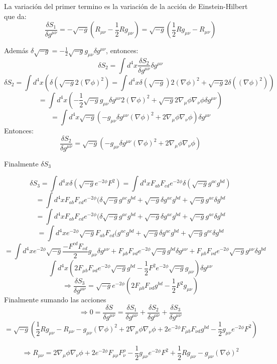 \documentclass[10pt,a4paper]{article}
\begin{document}
La variación del primer termino es la variación de la acción de Einstein-Hilbert que da:
$$\frac{\delta S_1}{\delta g^{\mu\nu}} = -\sqrt{-g}(R_{\mu\nu} - \frac{1}{2}Rg_{\mu\nu})=\sqrt{-g}(\frac{1}{2}Rg_{\mu\nu}- R_{\mu\nu}) $$

Además $\delta\sqrt{-g} = -\frac{1}{2} \sqrt{-g} g_{\mu\nu}\delta g^{\mu\nu}$, entonces:
$$\delta S_2 = \int d^4 x \frac{\delta S_2}{\delta g^{\mu \nu}}\delta g^{\mu \nu}$$
$$\delta S_2 = \int d^4 x (\delta(\sqrt{-g}2(\nabla \phi)^2)= \int d^4 x \delta(\sqrt{-g})2(\nabla \phi)^2 + \sqrt{-g}2\delta((\nabla \phi)^2))$$
$$= \int d^4 x (-\frac{1}{2} \sqrt{-g} g_{\mu\nu}\delta g^{\mu\nu}2(\nabla \phi)^2 + \sqrt{-g}2\nabla_\mu \phi \nabla_\nu \phi \delta g^{\mu \nu})$$
$$= \int d^4 x \sqrt{-g}(-g_{\mu\nu}\delta g^{\mu\nu}(\nabla \phi)^2 + 2\nabla_\mu \phi \nabla_\nu \phi) \delta g^{\mu \nu}$$
Entonces:
$$\frac{\delta S_2}{\delta g^{\mu \nu}}= \sqrt{-g}(-g_{\mu\nu}\delta g^{\mu\nu}(\nabla \phi)^2 + 2\nabla_\mu \phi \nabla_\nu \phi) $$

Finalmente $\delta S_3$

$$\delta S_3 = \int d^4x \delta(\sqrt{-g}e^{-2 \phi} F^2) = \int d^4x F_{ab}F_{cd}e^{-2 \phi}\delta(\sqrt{-g} g^{ac}g^{bd})$$
$$= \int d^4x F_{ab}F_{cd}e^{-2 \phi}(\delta\sqrt{-g} g^{ac}g^{bd} + \sqrt{-g} \delta g^{ac}g^{bd} + \sqrt{-g} g^{ac}\delta g^{bd}$$
$$= \int d^4x F_{ab}F_{cd}e^{-2 \phi}(\delta\sqrt{-g} g^{ac}g^{bd} + \sqrt{-g} \delta g^{ac}g^{bd} + \sqrt{-g} g^{ac}\delta g^{bd}$$
$$= \int d^4x e^{-2 \phi}\sqrt{-g}F_{ab}F_{cd}( g^{ac}g^{bd} + \sqrt{-g} \delta g^{ac}g^{bd} + \sqrt{-g} g^{ac}\delta g^{bd}$$
$$= \int d^4x e^{-2 \phi}\sqrt{-g}\frac{-F^{cd}F_{cd}}{2} g_{\mu \nu} \delta g^{\mu \nu} + F_{\mu b} F_{\nu d}e^{-2 \phi}\sqrt{-g} g^{bd} \delta g^{\mu \nu} + F_{\mu b} F_{\nu d}e^{-2 \phi}\sqrt{-g} g^{\mu \nu} \delta g^{bd} $$
$$\int d^4 x(2 F_{\mu b} F_{\nu d}e^{-2 \phi}\sqrt{-g} g^{b d} - \frac{1}{2}  F^2 e^{-2 \phi} \sqrt{-g} g_{\mu \nu}) \delta g^{\mu \nu}$$
$$\Rightarrow \frac{\delta S_3}{\delta g^{\mu \nu}} = \sqrt{-g}e^{-2 \phi}(2 F_{\mu b} F_{\nu d} g^{b d} - \frac{1}{2}  F^2 g_{\mu \nu})$$
Finalmente sumando las acciones
$$\Rightarrow 0 = \frac{\delta S}{\delta g^{\mu \nu}}=\frac{\delta S_1}{\delta g^{\mu \nu}} +\frac{\delta S_2}{\delta g^{\mu \nu}} +\frac{\delta S_3}{\delta g^{\mu \nu}}$$
$$ = \sqrt{-g}(\frac{1}{2}Rg_{\mu\nu}- R_{\mu\nu} -g_{\mu\nu}(\nabla \phi)^2 + 2\nabla_\mu \phi \nabla_\nu \phi + 2e^{-2 \phi} F_{\mu b} F_{\nu d} g^{b d} - \frac{1}{2}  g_{\mu \nu}e^{-2 \phi}F^2)$$

$$\Rightarrow R_{\mu \nu} = 2\nabla_\mu \phi \nabla_\nu \phi+ 2e^{-2 \phi} F_{\mu \rho} F^{\rho}_{\nu} - \frac{1}{2}  g_{\mu \nu}e^{-2 \phi}F^2 + \frac{1}{2}Rg_{\mu\nu} - g_{\mu\nu} (\nabla \phi)^2$$
\end{document}
